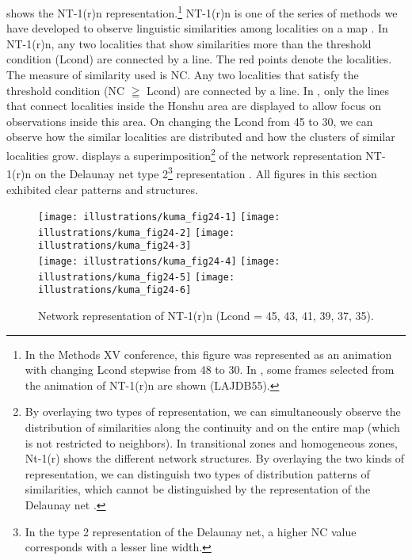 \documentclass[output=paper]{LSP/langsci}
\begin{document}
 shows the NT-1(r)n representation.\footnote{ In the Methods XV conference, this figure was represented as an animation with changing Lcond stepwise from 48 to 30. In , some frames selected from the animation of NT-1(r)n are shown (LAJDB55).} NT-1(r)n is one of the series of methods we have developed to observe linguistic similarities among localities on a map \citep[2]{kumagai_development_2013}. In NT-1(r)n, any two localities that show similarities more than the threshold condition (Lcond) are connected by a line. The red points denote the localities. The measure of similarity used is NC. Any two localities that satisfy the threshold condition (NC \textsf{${\geqq}$ }Lcond) are connected by a line. In , only the lines that connect localities inside the Honshu area are displayed to allow focus on observations inside this area. On changing the Lcond from 45 to 30, we can observe how the similar localities are distributed and how the clusters of similar localities grow.  displays a superimposition\footnote{By overlaying two types of representation, we can simultaneously observe the distribution of similarities along the continuity and on the entire map (which is not restricted to neighbors). In transitional zones and homogeneous zones, Nt-1(r) shows the different network structures. By overlaying the two kinds of representation, we can distinguish two types of distribution patterns of similarities, which cannot be distinguished by the representation of the Delaunay net \citep[7]{kumagai_development_2013}.} of the network representation NT-1(r)n on the Delaunay net type 2\footnote{ In the type 2 representation of the Delaunay net, a higher NC value corresponds with a lesser line width.} representation \citep[6--7]{kumagai_development_2013}. All figures in this section exhibited clear patterns and structures. 


\begin{figure}[t]
\texttt{[image: illustrations/kuma\_fig24-1]}
\texttt{[image: illustrations/kuma\_fig24-2]}
\texttt{[image: illustrations/kuma\_fig24-3]}
\\
\texttt{[image: illustrations/kuma\_fig24-4]}
\texttt{[image: illustrations/kuma\_fig24-5]}
\texttt{[image: illustrations/kuma\_fig24-6]}
\caption{Network representation of NT-1(r)n (Lcond = 45, 43, 41, 39, 37, 35).}
\label{fig:kuma:24}
\end{figure}
\end{document}
